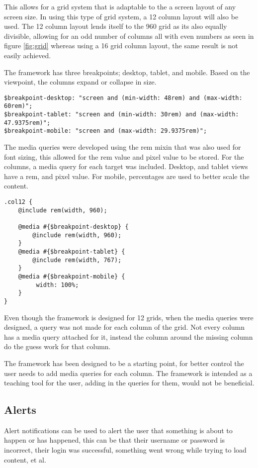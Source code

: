 This allows for a grid system that is adaptable to the a screen layout of any screen size. In using this type of grid system, a 12 column layout will also be used. The 12 column layout lends itself to the 960 grid as its also equally divisible, allowing for an odd number of columns all with even numbers as seen in figure \ref{fig:grid} whereas using a 16 grid column layout, the same result is not easily achieved. 

The framework has three breakpoints; desktop, tablet, and mobile. Based on the viewpoint, the columns expand or collapse in size. 

\begin{lstlisting}[language=CSS3]
$breakpoint-desktop: "screen and (min-width: 48rem) and (max-width: 60rem)";
$breakpoint-tablet: "screen and (min-width: 30rem) and (max-width: 47.9375rem)";
$breakpoint-mobile: "screen and (max-width: 29.9375rem)";
\end{lstlisting}


\newpage
The media queries were developed using the rem mixin that was also used for font sizing, this allowed for the rem value and pixel value to be stored. For the columns, a media query for each target was included. Desktop, and tablet views have a rem, and pixel value. For mobile, percentages are used to better scale the content.

\begin{lstlisting}[language=CSS3]
.col12 {
	@include rem(width, 960);

	@media #{$breakpoint-desktop} {
		@include rem(width, 960);
	}
	@media #{$breakpoint-tablet} {
		@include rem(width, 767);
	}
	@media #{$breakpoint-mobile} {
		 width: 100%;
	}
}
\end{lstlisting}

Even though the framework is designed for 12 grids, when the media queries were designed, a query was not made for each column of the grid. Not every column has a media query attached for it, instead the column around the missing column do the guess work for that column. 

The framework has been designed to be a starting point, for better control the user needs to add media queries for each column. The framework is intended as a teaching tool for the user, adding in the queries for them, would not be beneficial. 

\subsection*{Alerts}
Alert notifications can be used to alert the user that something is about to happen or has happened, this can be that their username or password is incorrect, their login was successful, something went wrong while trying to load content, et al.

